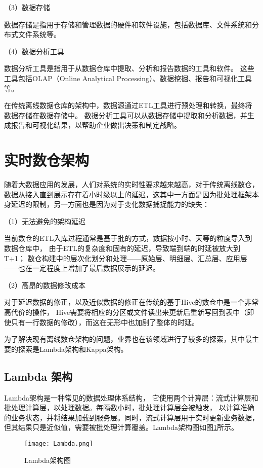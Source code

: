 （3）数据存储

数据存储是指用于存储和管理数据的硬件和软件设施，包括数据库、文件系统和分布式文件系统等。

（4）数据分析工具

数据分析工具是指用于从数据仓库中提取、分析和报告数据的工具和软件。
这些工具包括OLAP（Online Analytical Processing）、数据挖掘、报告和可视化工具等。

在传统离线数据仓库的架构中，数据源通过ETL工具进行预处理和转换，最终将数据存储在数据存储中。
数据分析工具可以从数据存储中提取和分析数据，并生成报告和可视化结果，以帮助企业做出决策和制定战略。

\section{实时数仓架构}

随着大数据应用的发展，人们对系统的实时性要求越来越高，对于传统离线数仓，
数据从接入直到展示存在着小时级以上的延迟\cite{25}，这其中一方面是因为批处理框架本身延迟的限制，另一方面也是因为对于变化数据捕捉能力的缺失：

（1）无法避免的架构延迟

当前数仓的ETL入库过程通常是基于批的方式，数据按小时、天等的粒度导入到数据仓库中，
由于ETL的复杂度和固有的延迟，导致端到端的时延被放大到T+1；
数仓构建中的层次化划分和处理——原始层、明细层、汇总层、应用层——也在一定程度上增加了最后数据展示的延迟。

（2）高昂的数据修改成本

对于延迟数据的修正，以及近似数据的修正在传统的基于Hive的数仓中是一个非常高代价的操作，
Hive需要将相应的分区或文件读出来更新后重新写回到表中（即使只有一行数据的修改），而这在无形中也加剧了整体的时延。

为了解决现有离线数仓架构的问题，业界也在该领域进行了较多的探索，其中最主要的探索是Lambda架构和Kappa架构。

\subsection{Lambda 架构}

Lambda架构是一种常见的数据处理体系结构，
它使用两个计算层：流式计算层和批处理计算层，以处理数据。每隔数小时，批处理计算层会被触发，
以计算准确的业务状态，并将结果加载到服务层。同时，流式计算层用于实时更新业务数据，
但其结果只是近似值，需要被批处理计算覆盖\cite{3}。Lambda架构图如图\ref{fig:Lambda架构图}所示。

\begin{figure}[H]
  \centering
  \texttt{[image: Lambda.png]}
  \caption{Lambda架构图}
  \label{fig:Lambda架构图}
\end{figure}

